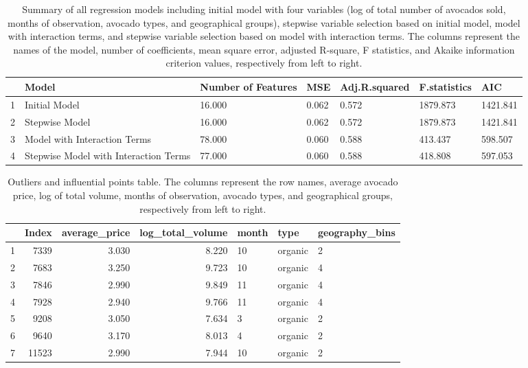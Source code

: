 \documentclass[11pt]{article}\usepackage[]{graphicx}\usepackage[]{color}
\begin{document}
\begin{center}
\begin{table}[ht]
\centering
\begin{tabular}{rp{1.5in}p{.8in}llll}
  \hline
 & Model & Number of Features & MSE & Adj.R.squared & F.statistics & AIC \\ 
  \hline
1 & Initial Model & 16.000 & 0.062 & 0.572 & 1879.873 & 1421.841 \\ 
  2 & Stepwise Model & 16.000 & 0.062 & 0.572 & 1879.873 & 1421.841 \\ 
  3 & Model with Interaction Terms & 78.000 & 0.060 & 0.588 & 413.437 & 598.507 \\ 
  4 & Stepwise Model with Interaction Terms & 77.000 & 0.060 & 0.588 & 418.808 & 597.053 \\ 
   \hline
\end{tabular}
\caption{Summary of all regression models including initial model with four variables (log of total number of avocados sold, months of observation, avocado types, and geographical groups), stepwise variable selection based on initial model, model with interaction terms, and stepwise variable selection based on model with interaction terms. The columns represent the names of the model, number of coefficients, mean square error, adjusted R-square, F statistics, and Akaike information criterion values, respectively from left to right.} 
\label{reg_vali_metric}
\end{table}

\end{center} 


\begin{center}
\begin{table}[ht]
\centering
\begin{tabular}{rrrrlll}
  \hline
 & Index & average\_price & log\_total\_volume & month & type & geography\_bins \\ 
  \hline
1 & 7339 & 3.030 & 8.220 & 10 & organic & 2 \\ 
  2 & 7683 & 3.250 & 9.723 & 10 & organic & 4 \\ 
  3 & 7846 & 2.990 & 9.849 & 11 & organic & 4 \\ 
  4 & 7928 & 2.940 & 9.766 & 11 & organic & 4 \\ 
  5 & 9208 & 3.050 & 7.634 & 3 & organic & 2 \\ 
  6 & 9640 & 3.170 & 8.013 & 4 & organic & 2 \\ 
  7 & 11523 & 2.990 & 7.944 & 10 & organic & 2 \\ 
   \hline
\end{tabular}
\caption{Outliers and influential points table. The columns represent the row names, average avocado price, log of total volume, months of observation, avocado types, and geographical groups, respectively from left to right.} 
\label{outliers_table}
\end{table}

\end{center} 
\end{document}
